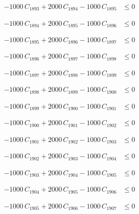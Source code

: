 \documentclass[a4paper,11pt]{article}
\begin{document}
\begin{align}
-1000\,C_{1893} + 2000\,C_{1894} - 1000\,C_{1895} &\leq 0 \nonumber
\end{align}

\begin{align}
-1000\,C_{1894} + 2000\,C_{1895} - 1000\,C_{1896} &\leq 0 \nonumber
\end{align}

\begin{align}
-1000\,C_{1895} + 2000\,C_{1896} - 1000\,C_{1897} &\leq 0 \nonumber
\end{align}

\begin{align}
-1000\,C_{1896} + 2000\,C_{1897} - 1000\,C_{1898} &\leq 0 \nonumber
\end{align}

\begin{align}
-1000\,C_{1897} + 2000\,C_{1898} - 1000\,C_{1899} &\leq 0 \nonumber
\end{align}

\begin{align}
-1000\,C_{1898} + 2000\,C_{1899} - 1000\,C_{1900} &\leq 0 \nonumber
\end{align}

\begin{align}
-1000\,C_{1899} + 2000\,C_{1900} - 1000\,C_{1901} &\leq 0 \nonumber
\end{align}

\begin{align}
-1000\,C_{1900} + 2000\,C_{1901} - 1000\,C_{1902} &\leq 0 \nonumber
\end{align}

\begin{align}
-1000\,C_{1901} + 2000\,C_{1902} - 1000\,C_{1903} &\leq 0 \nonumber
\end{align}

\begin{align}
-1000\,C_{1902} + 2000\,C_{1903} - 1000\,C_{1904} &\leq 0 \nonumber
\end{align}

\begin{align}
-1000\,C_{1903} + 2000\,C_{1904} - 1000\,C_{1905} &\leq 0 \nonumber
\end{align}

\begin{align}
-1000\,C_{1904} + 2000\,C_{1905} - 1000\,C_{1906} &\leq 0 \nonumber
\end{align}

\begin{align}
-1000\,C_{1905} + 2000\,C_{1906} - 1000\,C_{1907} &\leq 0 \nonumber
\end{align}
\end{document}
